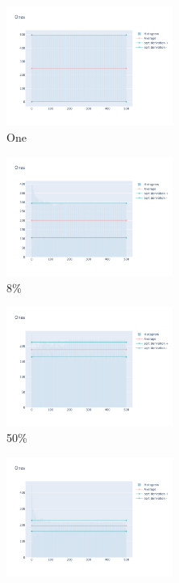 \documentclass[12pt, fleqn]{report}                             %
\theoremstyle{break}                                            %
\begin{document}
      \begin{figure}[ht!]
        \centering
        \begin{subfigure}[b]{0.4\linewidth}
          \includegraphics[width=0.6\textwidth]{Images/41/dia-a.png}
          \caption{One}
        \end{subfigure}
        \begin{subfigure}[b]{0.4\linewidth}
          \includegraphics[width=0.6\textwidth]{Images/41/dia-b.png}
          \caption{8\%}
        \end{subfigure}
        \begin{subfigure}[b]{0.4\linewidth}
          \includegraphics[width=0.6\textwidth]{Images/41/dia-c.png}
          \caption{50\%}
        \end{subfigure}
        \begin{subfigure}[b]{0.4\linewidth}
          \includegraphics[width=0.6\textwidth]{Images/41/dia-d.png}

\end{subfigure}
\end{figure}
\end{document}

